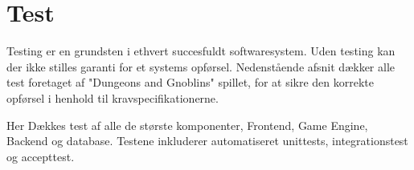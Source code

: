 \section{Test}
Testing er en grundsten i ethvert succesfuldt softwaresystem. Uden testing kan
der ikke stilles garanti for et systems opførsel. Nedenstående afsnit dækker
alle test foretaget af "Dungeons and Gnoblins" spillet, for at sikre den korrekte
opførsel i henhold til kravspecifikationerne.

Her Dækkes test af alle de største komponenter, Frontend, Game Engine, Backend og
database. Testene inkluderer automatiseret unittests, integrationstest og accepttest.






